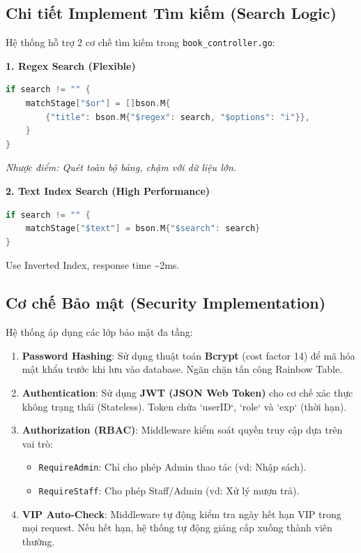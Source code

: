 \documentclass[a4paper,12pt]{article}
\begin{document}
\subsection{Chi tiết Implement Tìm kiếm (Search Logic)}
Hệ thống hỗ trợ 2 cơ chế tìm kiếm trong \texttt{book\_controller.go}:

\textbf{1. Regex Search (Flexible)}
\begin{lstlisting}[language=Go]
if search != "" {
    matchStage["$or"] = []bson.M{
        {"title": bson.M{"$regex": search, "$options": "i"}},
    }
}
\end{lstlisting}
\textit{Nhược điểm: Quét toàn bộ bảng, chậm với dữ liệu lớn.}

\textbf{2. Text Index Search (High Performance)}
\begin{lstlisting}[language=Go]
if search != "" {
    matchStage["$text"] = bson.M{"$search": search}
}
\end{lstlisting}
Use Inverted Index, response time \textasciitilde 2ms.

\subsection{Cơ chế Bảo mật (Security Implementation)}
Hệ thống áp dụng các lớp bảo mật đa tầng:
\begin{enumerate}
    \item \textbf{Password Hashing}: Sử dụng thuật toán \textbf{Bcrypt} (cost factor 14) để mã hóa mật khẩu trước khi lưu vào database. Ngăn chặn tấn công Rainbow Table.
    \item \textbf{Authentication}: Sử dụng \textbf{JWT (JSON Web Token)} cho cơ chế xác thực không trạng thái (Stateless). Token chứa `userID`, `role` và `exp` (thời hạn).
    \item \textbf{Authorization (RBAC)}: Middleware kiểm soát quyền truy cập dựa trên vai trò:
    \begin{itemize}
        \item \texttt{RequireAdmin}: Chỉ cho phép Admin thao tác (vd: Nhập sách).
        \item \texttt{RequireStaff}: Cho phép Staff/Admin (vd: Xử lý mượn trả).
    \end{itemize}
    \item \textbf{VIP Auto-Check}: Middleware tự động kiểm tra ngày hết hạn VIP trong mọi request. Nếu hết hạn, hệ thống tự động giáng cấp xuống thành viên thường.
\end{enumerate}
\end{document}
